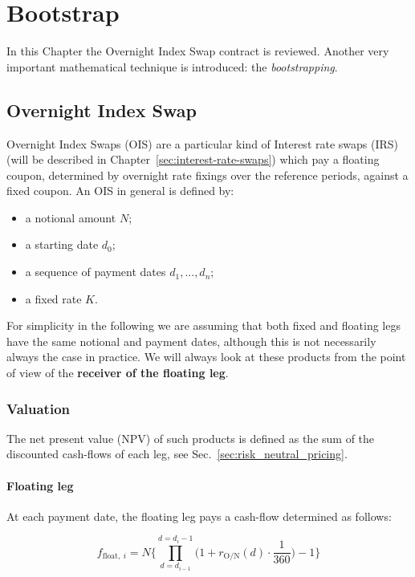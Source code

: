 \chapter{Bootstrap}
\label{sec:swaps-and-bootstrapping}

In this Chapter the Overnight Index Swap contract is reviewed. Another very important mathematical technique is introduced: the \emph{bootstrapping}.

\section{Overnight Index Swap}
\label{overnight-index-swap}

Overnight Index Swaps (OIS) are a particular kind of Interest rate swaps (IRS) (will be described in Chapter~\ref{sec:interest-rate-swaps}) which pay a floating coupon, determined by overnight rate fixings over the reference periods, against a fixed coupon. An OIS in general is defined by:

\begin{itemize}
\tightlist
\item
  a notional amount $N$;
\item
  a starting date $d_0$;
\item
  a sequence of payment dates $d_1,...,d_n$;
\item
  a fixed rate $K$.
\end{itemize}

For simplicity in the following we are assuming that both fixed and floating legs have the same notional and payment dates, although this is not necessarily
always the case in practice. We will always look at these products from the point of view of the \textbf{receiver of the floating leg}.

\subsection{Valuation}
\label{ois-valuation}
The net present value (NPV) of such products is defined as the sum of the discounted cash-flows of each leg, see Sec.~\ref{sec:risk_neutral_pricing}.

\subsubsection{Floating leg}
\label{floating-leg}
At each payment date, the floating leg pays a cash-flow determined as follows:

\begin{equation}
f_{\mathrm{float},~i} = N \Bigg\{\prod_{d=d_{i-1}}^{d=d_i-1}\Big(1+r_{\mathrm{O/N}}(d)\cdot\frac{1}{360}\Big) -1 \Bigg\}
\label{eq:floating_ois}
\end{equation}

